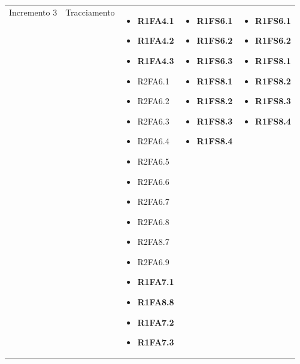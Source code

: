 {\begin{longtable}{C{2.5cm} C{3.2cm} C{2.8cm} C{2.8cm} C{2.8cm}}
Incremento 3 & Tracciamento & \begin{itemize}
    \item[ ] \textbf{R1FA4.1}
    \item[ ] \textbf{R1FA4.2}
    \item[ ] \textbf{R1FA4.3}
    \item[ ] R2FA6.1
    \item[ ] R2FA6.2
    \item[ ] R2FA6.3
    \item[ ] R2FA6.4
    \item[ ] R2FA6.5
    \item[ ] R2FA6.6
    \item[ ] R2FA6.7
    \item[ ] R2FA6.8
    \item[ ] R2FA8.7
    \item[ ] R2FA6.9
    \item[ ] \textbf{R1FA7.1}
    \item[ ] \textbf{R1FA8.8}
    \item[ ] \textbf{R1FA7.2}
    \item[ ] \textbf{R1FA7.3}
\end{itemize}& \begin{itemize} 
    \item[ ] \textbf{R1FS6.1}
    \item[ ] \textbf{R1FS6.2}
    \item[ ] \textbf{R1FS6.3}
    \item[ ] \textbf{R1FS8.1}
    \item[ ] \textbf{R1FS8.2}
    \item[ ] \textbf{R1FS8.3}
    \item[ ] \textbf{R1FS8.4}

\end{itemize} & \begin{itemize} 
    \item[ ] \textbf{R1FS6.1}
    \item[ ] \textbf{R1FS6.2}
    \item[ ] \textbf{R1FS8.1}
    \item[ ] \textbf{R1FS8.2}
    \item[ ] \textbf{R1FS8.3}
    \item[ ] \textbf{R1FS8.4}
\end{itemize}\\


\end{longtable}}

